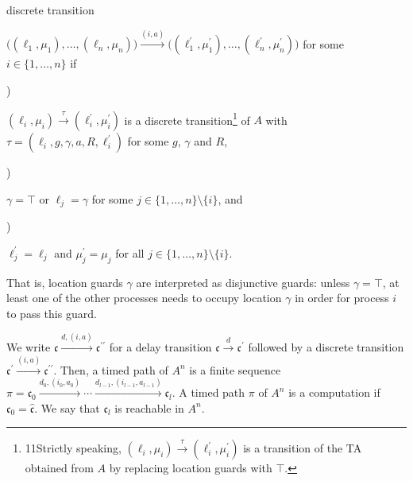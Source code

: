 \documentclass[10pt,a4paper]{article}
\begin{document}
  discrete transition  
 
${\big((\mathrm{\ell}_{1},\mu_{1}),\ldots,(\mathrm{\ell}_{n},\mu_{n})\big)}\xrightarrow{(i,a)}{\big((\mathrm{\ell}_{1}^{\prime},\mu_{1}^{\prime}),\ldots,(\mathrm{\ell}_{n}^{\prime},\mu_{n}^{\prime})\big)}$ for some $i\in\{1,\dots,n\}$ if\par
  
\par{}) 
 
${(\mathrm{\ell}_{i},\mu_{i})}\xrightarrow{\tau}{(\mathrm{\ell}_{i}^{\prime},\mu_{i}^{\prime})}$ is a discrete transition\footnote{11Strictly speaking, ${(\mathrm{\ell}_{i},\mu_{i})}\xrightarrow{\tau}{(\mathrm{\ell}_{i}^{\prime},\mu_{i}^{\prime})}$ is a transition of the TA obtained from ${A}$ by replacing location guards with $\top$. } of ${A}$ with $\tau=(\mathrm{\ell}_{i},g,\gamma,a,R,\mathrm{\ell}_{i}^{\prime})$ for some $g$, $\gamma$ and $R$,\par
 
 
 
\par{}) 
 
$\gamma=\top$ or $\mathrm{\ell}_{j}=\gamma$ for some $j\in\{1,\dots,n\}\setminus\{i\}$, and\par
 
 
 
\par{}) 
 
$\mathrm{\ell}_{j}^{\prime}=\mathrm{\ell}_{j}$ and $\mu_{j}^{\prime}=\mu_{j}$ for all $j\in\{1,\dots,n\}\setminus\{i\}$.\par
 
 
  
   
 
 
That is, location guards $\gamma$ are interpreted as disjunctive guards: unless $\gamma=\top$, at least one of the other processes needs to occupy location $\gamma$ in order for process $i$ to pass this guard.\par
 
 
 
We write ${\mathfrak{c}}\xrightarrow{d,(i,a)}{\mathfrak{c}^{\prime\prime}}$ for a delay transition ${\mathfrak{c}}\xrightarrow{d}{\mathfrak{c}^{\prime}}$ followed by a discrete transition ${\mathfrak{c}^{\prime}}\xrightarrow{(i,a)}{\mathfrak{c}^{\prime\prime}}$. Then, a timed path of ${{A}}^{n}$ is a finite sequence $\pi=\mathfrak{c}_{0}\xrightarrow{d_{0},(i_{0},a_{0})}\cdots\xrightarrow{d_{l-1},(i_{l-1},a_{l-1})}\mathfrak{c}_{l}$. A timed path $\pi$ of ${{A}}^{n}$ is a computation if $\mathfrak{c}_{0}=\hat{\mathfrak{c}}$. We say that $\mathfrak{c}_{l}$ is reachable in ${{A}}^{n}$.\par
 
\end{document}
